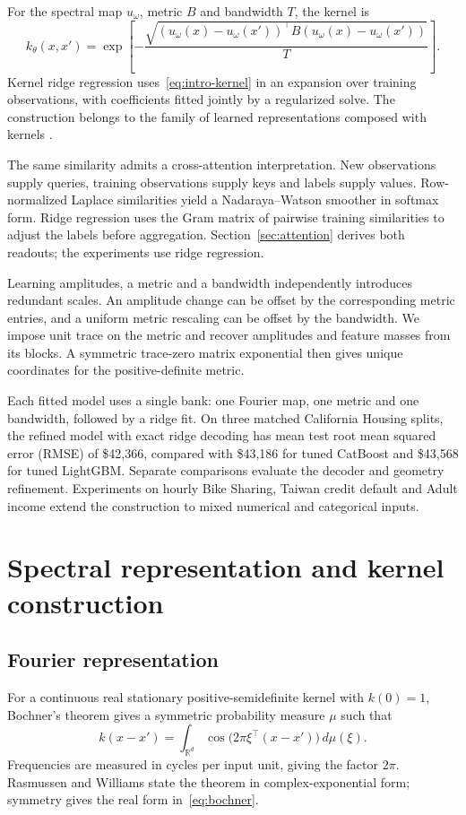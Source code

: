 \documentclass[11pt]{article}
\newcommand{\R}{\mathbb R}
\begin{document}
For the spectral map $u_\omega$, metric $B$ and bandwidth $T$, the kernel is
\begin{equation}
 k_\theta(x,x')=
 \exp\!\left[-\frac{\sqrt{(u_\omega(x)-u_\omega(x'))^\top
 B(u_\omega(x)-u_\omega(x'))}}{T}\right].
 \label{eq:intro-kernel}
\end{equation}
Kernel ridge regression uses~\eqref{eq:intro-kernel} in an expansion over training observations, with coefficients fitted jointly by a regularized solve. The construction belongs to the family of learned representations composed with kernels \cite{wilson2016}.

The same similarity admits a cross-attention interpretation. New observations supply queries, training observations supply keys and labels supply values. Row-normalized Laplace similarities yield a Nadaraya--Watson smoother in softmax form. Ridge regression uses the Gram matrix of pairwise training similarities to adjust the labels before aggregation. Section~\ref{sec:attention} derives both readouts; the experiments use ridge regression.

Learning amplitudes, a metric and a bandwidth independently introduces redundant scales. An amplitude change can be offset by the corresponding metric entries, and a uniform metric rescaling can be offset by the bandwidth. We impose unit trace on the metric and recover amplitudes and feature masses from its blocks. A symmetric trace-zero matrix exponential then gives unique coordinates for the positive-definite metric.

Each fitted model uses a single bank: one Fourier map, one metric and one bandwidth, followed by a ridge fit. On three matched California Housing splits, the refined model with exact ridge decoding has mean test root mean squared error (RMSE) of \$42,366, compared with \$43,186 for tuned CatBoost and \$43,568 for tuned LightGBM. Separate comparisons evaluate the decoder and geometry refinement. Experiments on hourly Bike Sharing, Taiwan credit default and Adult income extend the construction to mixed numerical and categorical inputs. 

\section{Spectral representation and kernel construction}
\subsection{Fourier representation}
For a continuous real stationary positive-semidefinite kernel with $k(0)=1$, Bochner's theorem gives a symmetric probability measure $\mu$ such that
\begin{equation}
 k(x-x')=\int_{\R^d}\cos\bigl(2\pi\xi^\top(x-x')\bigr)\,d\mu(\xi).
 \label{eq:bochner}
\end{equation}
Frequencies are measured in cycles per input unit, giving the factor $2\pi$. Rasmussen and Williams \cite[Theorem~4.1]{rasmussen2006} state the theorem in complex-exponential form; symmetry gives the real form in~\eqref{eq:bochner}.
\end{document}
